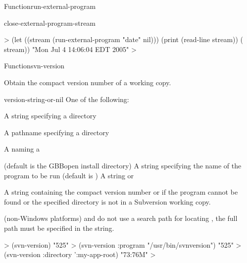 \documentclass[10pt,twoside,english,pdftex]{article}
\begin{document}
\begin{functiondoc}{Function}{run-external-program}{
    }
\begin{alsos}{close-external-program-stream}
\end{alsos}

%
\fnexample
%
\W\supp
\begin{example}
  > (let ((stream (run-external-program "date" nil)))
       (print (read-line stream))
       ( stream))
  "Mon Jul  4 14:06:04 EDT 2005" 
  >
\end{example}

\end{functiondoc}


\begin{functiondoc}{Function}{svn-version}{%
    }
%

\fnsyntax

\fnpurpose Obtain the 
compact version number of a working copy.

\fnpackage {}

\fnmodule {}

\fnargs
\begin{args}{version-string-or-nil}
\arg[directory] One of the following:
\begin{tightitemize}
\item A string specifying a directory
\item A pathname specifying a directory
\item A  naming a 
\end{tightitemize}
(default is the GBBopen install directory)
\arg[program] A string specifying the name of the program to be run (default
is )
 A string or \nil{}
\end{args}

\fnreturns A string containing the compact version number or \nil{} if the
program  cannot be found or the specified directory is
not in a Subversion working copy.
  
\fndescription
%
 (non-Windows platforms) and
 do not use a search path for
locating , the full path must be specified in the 
string.


\fnexamples
%
\W\supp
\begin{example}
  > (svn-version)
  "525" 
  > (svn-version :program "/usr/bin/svnversion")
  "525" 
  > (svn-version :directory ':my-app-root)
  "73:76M" 
  >
\end{example}

\end{functiondoc}
\end{document}
